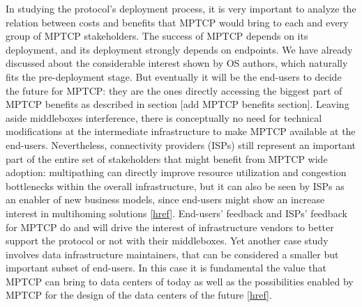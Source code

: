 In studying the protocol's deployment process, it is very important to analyze the relation between costs and benefits that MPTCP would bring to each and every group of MPTCP stakeholders.
The success of MPTCP depends on its deployment, and its deployment strongly depends on endpoints. We have already discussed about the considerable interest shown by OS authors, which naturally fits the pre-deployment stage. But eventually it will be the end-users to decide the future for MPTCP: they are the ones directly accessing the biggest part of MPTCP benefits as described in section [add MPTCP benefits section]. Leaving aside middleboxes interference, there is conceptually no need for technical modifications at the intermediate infrastructure to make MPTCP available at the end-users. Nevertheless, connectivity providers (ISPs) still represent an important part of the entire set of stakeholders that might benefit from MPTCP wide adoption: multipathing can directly improve resource utilization and congestion bottlenecks within the overall infrastructure, but it can also be seen by ISPs as an enabler of new business models, since end-users might show an increase interest in multihoming solutions [\href{https://books.google.de/books?id=ECBxhiURlKYC&pg=PA23&lpg=PA23&dq=mptcp+deployment&source=bl&ots=_cvPxxdH6K&sig=P5AlF9bU_iE3C63HfXvgD77tUg8&hl=en&sa=X&ved=0ahUKEwi0wMnuscfKAhUB1hQKHT0cARsQ6AEIUzAI#v=onepage&q&f=false}{href}]. End-users' feedback and ISPs' feedback for MPTCP do and will drive the interest of infrastructure vendors to better support the protocol or not with their middleboxes. 
Yet another case study involves data infrastructure maintainers, that can be considered a smaller but important subset of end-users. In this case it is fundamental the value that MPTCP can bring to data centers of today as well as the possibilities enabled by MPTCP for the design of the data centers of the future [\href{http://conferences.sigcomm.org/sigcomm/2011/papers/sigcomm/p266.pdf}{href}].


